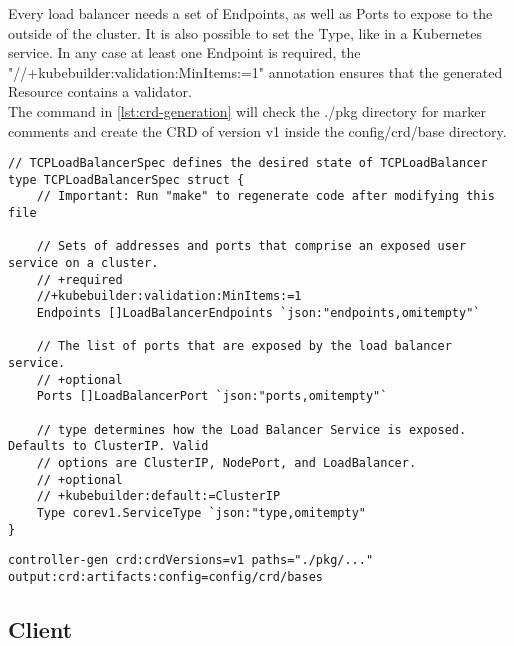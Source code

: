 Every load balancer needs a set of Endpoints, as well as Ports to expose to the outside of the cluster.
It is also possible to set the Type, like in a Kubernetes service.
In any case at least one Endpoint is required, the "//+kubebuilder:validation:MinItems:=1" annotation ensures that the generated Resource contains a validator.
\\
The command in \autoref{lst:crd-generation} will check the ./pkg directory for marker comments and create the CRD of version v1 inside the config/crd/base directory.
\\
\begin{lstlisting}[caption={TCPLoadBalancerSpec struct}, label={lst:tcpbl-spec}]
// TCPLoadBalancerSpec defines the desired state of TCPLoadBalancer
type TCPLoadBalancerSpec struct {
	// Important: Run "make" to regenerate code after modifying this file

	// Sets of addresses and ports that comprise an exposed user service on a cluster.
	// +required
	//+kubebuilder:validation:MinItems:=1
	Endpoints []LoadBalancerEndpoints `json:"endpoints,omitempty"`

	// The list of ports that are exposed by the load balancer service.
	// +optional
	Ports []LoadBalancerPort `json:"ports,omitempty"`

	// type determines how the Load Balancer Service is exposed. Defaults to ClusterIP. Valid
	// options are ClusterIP, NodePort, and LoadBalancer.
	// +optional
	// +kubebuilder:default:=ClusterIP
	Type corev1.ServiceType `json:"type,omitempty"
}
\end{lstlisting}

\begin{lstlisting}[numbers=none, caption={Generate CRD YAML files with controller-gen}, label={lst:crd-generation}]
	controller-gen crd:crdVersions=v1 paths="./pkg/..." output:crd:artifacts:config=config/crd/bases
\end{lstlisting}

\subsection{Client}\label{subsec:client}

